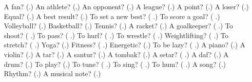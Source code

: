 \begin{tcolorbox}[breakable,colback=teal!4,colframe=teal!35!black,title={Before you move on}]
A fan? (\textbf{}.) An athlete? (\textbf{}.) An opponent? (\textbf{}.) A league? (\textbf{}.) A point? (\textbf{}.) A loser? (\textbf{}.) Equal? (\textbf{}.) A best result? (\textbf{}.) To set a new best? (\textbf{ }.) To score a goal? (\textbf{ }.) Volleyball? (\textbf{}.) Basketball? (\textbf{}.) Tennis? (\textbf{}.) A racket? (\textbf{}.) A goalkeeper? (\textbf{ }.) To shoot? (\textbf{ }.) To pass? (\textbf{ }.) To hurl? (\textbf{ }.) To wrestle? (\textbf{ }.) Weightlifting? (\textbf{ }.) To stretch? (\textbf{ }.) Yoga? (\textbf{}.) Fitness? (\textbf{ }.) Energetic? (\textbf{}.) To be lazy? (\textbf{ }.) A piano? (\textbf{}.) A violin? (\textbf{}.) A tar? (\textbf{}.) A santur? (\textbf{}.) A tombak? (\textbf{}.) A setar? (\textbf{ }.) A daf? (\textbf{}.) A drum? (\textbf{}.) To play? (\textbf{}.) To tune? (\textbf{ }.) To sing? (\textbf{ }.) To hum? (\textbf{ }.) A song? (\textbf{}.) Rhythm? (\textbf{}.) A musical note? (\textbf{}.)
\end{tcolorbox}
